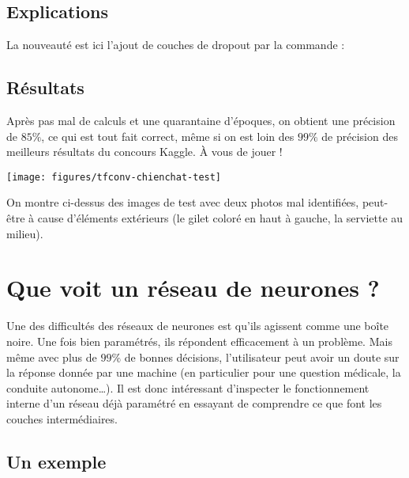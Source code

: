 \documentclass[11pt,class=report,crop=false]{standalone}
\begin{document}
\subsection{Explications}

La nouveauté est ici l'ajout de couches de dropout par la commande :


\subsection{Résultats}

Après pas mal de calculs et une quarantaine d'époques, on obtient une précision de $85\%$, ce qui est tout fait correct, même si on est loin des $99\%$ de précision des meilleurs résultats du concours \og{}Kaggle\fg{}. \`A vous de jouer !

\begin{center}
\texttt{[image: figures/tfconv-chienchat-test]}
\end{center}

On montre ci-dessus des images de test avec deux photos mal identifiées, peut-être à cause d'éléments extérieurs (le gilet coloré en haut à gauche, la serviette au milieu).




\section{Que voit un réseau de neurones ?}

Une des difficultés des réseaux de neurones est qu'ils agissent comme une \og{}boîte noire\fg{}. Une fois bien paramétrés, ils répondent efficacement à un problème. Mais même avec plus de $99\%$ de bonnes décisions, l'utilisateur peut avoir un doute sur la réponse donnée par une machine (en particulier pour une question médicale, la conduite autonome\ldots). Il est donc intéressant d'inspecter le fonctionnement interne d'un réseau déjà paramétré en essayant de comprendre ce que font les couches intermédiaires.


\subsection{Un exemple}
\end{document}
